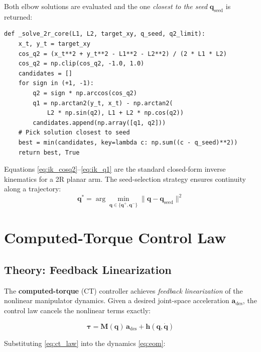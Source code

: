 \documentclass[11pt,a4paper]{article}
\newcommand{\bq}{\bm{q}}
\newcommand{\bdq}{\dot{\bm{q}}}
\newcommand{\btau}{\bm{\tau}}
\newcommand{\bM}{\bm{M}}
\newcommand{\bh}{\bm{h}}
\begin{document}
Both elbow solutions are evaluated and the one \emph{closest to the seed} $\bq_{\mathrm{seed}}$ is returned:

\begin{lstlisting}[caption={2R IK solver --- \texttt{robots/cup\_manipulator\_tendon.py}}]
def _solve_2r_core(L1, L2, target_xy, q_seed, q2_limit):
    x_t, y_t = target_xy
    cos_q2 = (x_t**2 + y_t**2 - L1**2 - L2**2) / (2 * L1 * L2)
    cos_q2 = np.clip(cos_q2, -1.0, 1.0)
    candidates = []
    for sign in (+1, -1):
        q2 = sign * np.arccos(cos_q2)
        q1 = np.arctan2(y_t, x_t) - np.arctan2(
            L2 * np.sin(q2), L1 + L2 * np.cos(q2))
        candidates.append(np.array([q1, q2]))
    # Pick solution closest to seed
    best = min(candidates, key=lambda c: np.sum((c - q_seed)**2))
    return best, True
\end{lstlisting}

\begin{codemath}
Equations \eqref{eq:ik_cosq2}--\eqref{eq:ik_q1} are the standard closed-form inverse kinematics for a 2R planar arm. The seed-selection strategy ensures continuity along a trajectory:
\[
    \bq^* = \arg\min_{\bq \in \{\bq^+, \bq^-\}} \|\bq - \bq_{\mathrm{seed}}\|^2
\]
\end{codemath}

\section{Computed-Torque Control Law}
\label{sec:ct_law}

\subsection{Theory: Feedback Linearization}

The \textbf{computed-torque} (CT) controller achieves \emph{feedback linearization} of the nonlinear manipulator dynamics. Given a desired joint-space acceleration $\bm{a}_{\mathrm{des}}$, the control law cancels the nonlinear terms exactly:

\begin{equation}
\boxed{
\btau = \bM(\bq)\,\bm{a}_{\mathrm{des}} + \bh(\bq, \bdq)
}
\label{eq:ct_law}
\end{equation}

Substituting \eqref{eq:ct_law} into the dynamics \eqref{eq:eom}:
\end{document}
